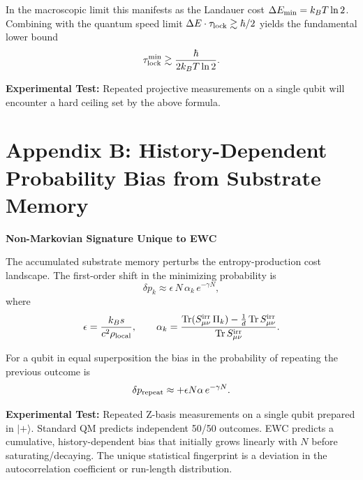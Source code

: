 \documentclass[11pt,letterpaper]{article}
\begin{document}
In the macroscopic limit this manifests as the Landauer cost \(\Delta E_{\rm min} = k_B T \ln 2\). Combining with the quantum speed limit \(\Delta E \cdot \tau_{\rm lock} \gtrsim \hbar/2\) yields the fundamental lower bound
\[
\tau_{\rm lock}^{\rm min} \gtrsim \frac{\hbar}{2 k_B T \ln 2}.
\]

\textbf{Experimental Test:} Repeated projective measurements on a single qubit will encounter a hard ceiling set by the above formula.

\section{Appendix B: History-Dependent Probability Bias from Substrate Memory}
\textbf{Non-Markovian Signature Unique to EWC}

The accumulated substrate memory perturbs the entropy-production cost landscape. The first-order shift in the minimizing probability is
\[
\delta p_k \approx \epsilon \, N \, \alpha_k \, e^{-\gamma N},
\]
where
\[
\epsilon = \frac{k_B s}{c^2 \rho_{\rm local}}, \qquad
\alpha_k = \frac{\operatorname{Tr}(S_{\mu\nu}^{\rm irr} \, \Pi_k) - \frac{1}{d} \operatorname{Tr} S_{\mu\nu}^{\rm irr}}{\operatorname{Tr} S_{\mu\nu}^{\rm irr}}.
\]

For a qubit in equal superposition the bias in the probability of repeating the previous outcome is
\[
\delta p_{\rm repeat} \approx +\epsilon N \alpha \, e^{-\gamma N}.
\]

\textbf{Experimental Test:} Repeated Z-basis measurements on a single qubit prepared in \(|+\rangle\). Standard QM predicts independent 50/50 outcomes. EWC predicts a cumulative, history-dependent bias that initially grows linearly with \(N\) before saturating/decaying. The unique statistical fingerprint is a deviation in the autocorrelation coefficient or run-length distribution.
\end{document}
